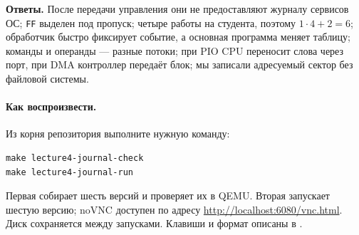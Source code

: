 \textbf{Ответы.} После передачи управления они не предоставляют
журналу сервисов ОС; \texttt{FF} выделен под пропуск; четыре работы на
студента, поэтому $1\cdot4+2=6$; обработчик быстро фиксирует событие,
а основная программа меняет таблицу; команды и операнды --- разные потоки;
при PIO CPU переносит слова через порт, при DMA контроллер передаёт
блок; мы записали адресуемый сектор без файловой системы.

\paragraph{Как воспроизвести.}
Из корня репозитория выполните нужную команду:
\begin{verbatim}
make lecture4-journal-check
make lecture4-journal-run
\end{verbatim}
Первая собирает шесть версий и проверяет их в QEMU. Вторая запускает
шестую версию; noVNC доступен по адресу
\url{http://localhost:6080/vnc.html}.
Диск  сохраняется между
запусками. Клавиши и формат описаны в
.
\endgroup
